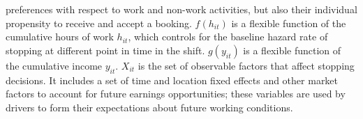 \documentclass[reviewmode]{restat}
\begin{document}
preferences with respect to work and non-work activities, but also their individual propensity to receive 
and accept a booking. %
$f(h_{it})$ is a flexible function of the cumulative hours of work $h_{it}$, which controls for the baseline 
hazard rate of stopping at different point in time in the shift. $g(y_{it})$ is a flexible function 
of the cumulative income $y_{it}$. %
$X_{it}$ is the set of observable factors that affect stopping decisions.  
It includes a set of time and location fixed effects and other market factors to account for 
future earnings opportunities; these variables are used by drivers to form their expectations 
about future working conditions.


\end{document}

